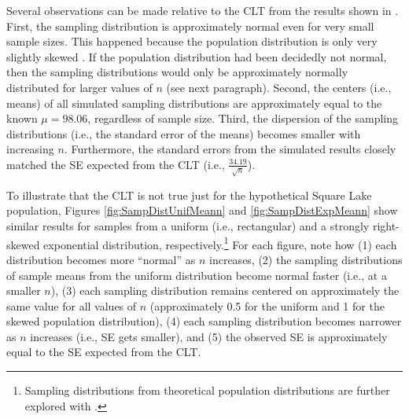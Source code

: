 \documentclass[10pt,openany]{book}\usepackage[]{graphicx}\usepackage[]{color}
\begin{document}
Several observations can be made relative to the CLT from the results shown in .  First, the sampling distribution is approximately normal even for very small sample sizes.  This happened because the population distribution is only very slightly skewed . If the population distribution had been decidedly not normal, then the sampling distributions would only be approximately normally distributed for larger values of $n$ (see next paragraph).  Second, the centers (i.e., means) of all simulated sampling distributions are approximately equal to the known $\mu=98.06$, regardless of sample size.  Third, the dispersion of the sampling distributions (i.e., the standard error of the means) becomes smaller with increasing $n$.  Furthermore, the standard errors from the simulated results closely matched the SE expected from the CLT (i.e., $\frac{34.19}{\sqrt{n}}$).

To illustrate that the CLT is not true just for the hypothetical Square Lake population, Figures \ref{fig:SampDistUnifMeann} and \ref{fig:SampDistExpMeann} show similar results for samples from a uniform (i.e., rectangular) and a strongly right-skewed exponential distribution, respectively.\footnote{Sampling distributions from theoretical population distributions are further explored with .}  For each figure, note how (1) each distribution becomes more ``normal'' as $n$ increases, (2) the sampling distributions of sample means from the uniform distribution become normal faster (i.e., at a smaller $n$), (3) each sampling distribution remains centered on approximately the same value for all values of $n$ (approximately 0.5 for the uniform and 1 for the skewed population distribution), (4) each sampling distribution becomes narrower as $n$ increases (i.e., SE gets smaller), and (5) the observed SE is approximately equal to the SE expected from the CLT.
\end{document}
